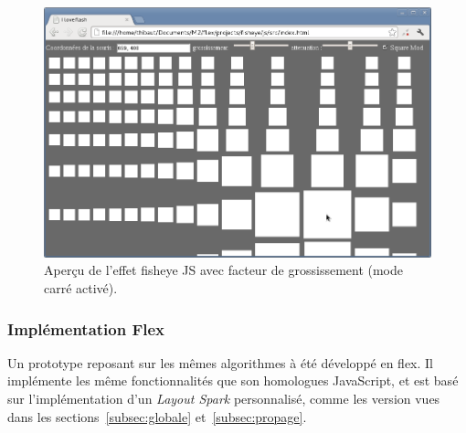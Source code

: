 \begin{minipage}[H]{.5\textwidth}
\begin{figure}[H]
  \centering
  \includegraphics[width=\textwidth]{../resources/illustrations/js_screen_3}
  \caption{Aperçu de l'effet fisheye JS avec facteur de grossissement (mode carré activé).}
  \label{fig:js_6}
\end{figure}
\end{minipage}

\subsubsection{Implémentation Flex}

Un prototype reposant sur les mêmes algorithmes à été développé en flex. Il implémente les même fonctionnalités que son homologues JavaScript, et est basé sur l'implémentation d'un \emph{Layout Spark} personnalisé, comme les version vues dans les sections~\ref{subsec:globale} et~\ref{subsec:propage}.

